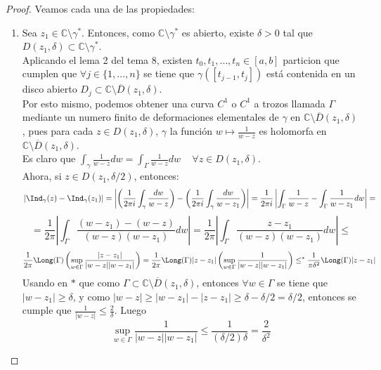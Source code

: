 \begin{proof}
    Veamos cada una de las propiedades:
    \begin{enumerate}
        \item Sea $z_1 \in \mathbb{C} \setminus \gamma^*$. Entonces, como $\mathbb{C} \setminus \gamma^*$ es abierto, existe $\delta > 0$ tal que $D(z_1, \delta) \subset \mathbb{C} \setminus \gamma^*$.\\
        Aplicando el lema 2 del tema 8, existen $t_0, t_1, \ldots, t_n \in [a,b]$ particion que cumplen que $\forall j \in \{1, \ldots, n\}$ se tiene que $\gamma([t_{j-1}, t_j])$ está contenida en un disco abierto $D_j \subset \mathbb{C} \setminus \overline{D} (z_1, \delta)$.\\
        Por esto mismo, podemos obtener una curva $C^1$ o $C^1$ a trozos llamada $\Gamma$ mediante un numero finito de deformaciones elementales de $\gamma$ en $\mathbb{C} \setminus \overline{D}(z_1, \delta)$, pues para cada $z \in D(z_1, \delta)$, $\gamma$ la función $w \mapsto \frac{1}{w - z}$ es holomorfa en $\mathbb{C} \setminus \overline{D}(z_1, \delta)$.\\
        Es claro que $\int_\gamma \frac{1}{w - z} dw = \int_\Gamma \frac{1}{w - z} dw \, \quad \forall z \in D(z_1, \delta)$.\\
        Ahora, si $z \in D(z_1, \delta/2)$, entonces:
        \[
        \left| \Ind_\gamma (z) - \Ind_\gamma (z_1) \right| = 
        \left| \left( \frac{1}{2 \pi i} \int_\gamma \frac{dw}{w - z} \right) - 
        \left( \frac{1}{2 \pi i} \int_\gamma \frac{dw}{w - z_1} \right) \right| =
        \frac{1}{2 \pi i} \left| \int_\Gamma \frac{1}{w - z} - \int_\Gamma \frac{1}{w - z_1} dw \right| =  
        \]
        \[
        = \frac{1}{2 \pi } \left| \int_\Gamma \frac{(w - z_1) - (w - z)}{(w - z)(w - z_1)} dw \right| =
        \frac{1}{2 \pi } \left| \int_\Gamma \frac{z - z_1}{(w - z)(w - z_1)} dw \right| \leq
        \]
        \[
        \frac{1}{2 \pi } \Long (\Gamma) \left(\sup_{w \in \Gamma} \frac{|z-z_1|}{|w - z||w - z_1|}\right)  =
        \frac{1}{2 \pi } \Long (\Gamma) |z - z_1| \left(\sup_{w \in \Gamma} \frac{1}{|w - z||w - z_1|}\right)  \leq^*
        \frac{1}{\pi  \delta^2} \Long (\Gamma) |z - z_1|
        \]
        Usando en $*$ que como $\Gamma \subset \mathbb{C} \setminus \overline{D}(z_1, \delta)$, entonces $\forall w \in \Gamma$ se tiene que $|w - z_1| \geq \delta$, y como $|w-z| \geq |w - z_1| - |z - z_1| \geq \delta - \delta/2 = \delta/2$, entonces se cumple que $\frac{1}{|w - z|} \leq \frac{2}{\delta}$. Luego 
        \[
            \sup_{w \in \Gamma} \frac{1}{|w-z||w-z_1|} \leq \frac{1}{(\delta/2)\delta} = \frac{2}{\delta^2}
\]
\end{enumerate}
\end{proof}
